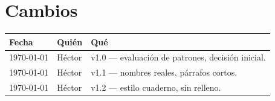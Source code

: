 \documentclass[11pt,a4paper]{article}
\begin{document}
\section{Cambios}

\begin{tabular}{p{2cm} p{2.5cm} p{9cm}}
\toprule
Fecha & Quién & Qué \\
\midrule
\today & Héctor & v1.0 — evaluación de patrones, decisión inicial. \\
\today & Héctor & v1.1 — nombres reales, párrafos cortos. \\
\today & Héctor & v1.2 — estilo cuaderno, sin relleno. \\
\bottomrule
\end{tabular}
\end{document}
